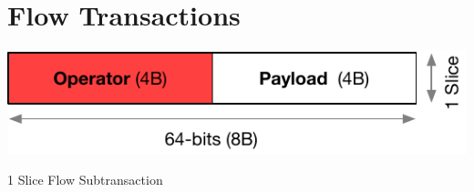 \documentclass[../OAE-SPEC-MAIN.tex]{subfiles}
\begin{document}




\section{Flow Transactions}

\begin{marginfigure}[-55mm]
  \includegraphics[width=\linewidth]{./figures/1-slice.pdf}
  \caption{1  Slice Flow Subtransaction}
\end{marginfigure}
\end{document}
